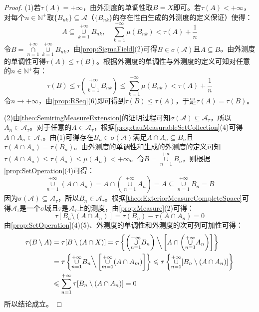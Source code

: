 \begin{proof}
	(1)若$\tau(A)=+\infty$，由外测度的单调性取$B=X$即可。若$\tau(A)<+\infty$，对每个$n\in\mathbb{N}^+$取$\{B_{nk}\}\subseteq\mathscr{A}$（$\{B_{nk}\}$的存在性由生成的外测度的定义保证）使得：
	\begin{equation*}
		A\subseteq\underset{k=1}{\overset{+\infty}{\cup}}B_{nk},\quad\sum_{k=1}^{+\infty}\mu(B_{nk})<\tau(A)+\frac{1}{n}
	\end{equation*}
	令$B=\underset{n=1}{\overset{+\infty}{\cap}}\underset{k=1}{\overset{+\infty}{\cup}}B_{nk}$，由\cref{prop:SigmaField}(2)可得$B\in\sigma(\mathscr{A})$且$A\subseteq B$。由外测度的单调性可得$\tau(A)\leqslant\tau(B)$。根据外测度的单调性与外测度的定义可知对任意的$n\in\mathbb{N}^+$有：
	\begin{equation*}
		\tau(B)\leqslant\tau\left(\underset{k=1}{\overset{+\infty}{\cup}}B_{nk}\right)\leqslant\sum_{k=1}^{+\infty}\mu(B_{nk})<\tau(A)+\frac{1}{n}
	\end{equation*}
	令$n\to+\infty$，由\cref{prop:RSeq}(6)即可得到$\tau(B)\leqslant\tau(A)$，于是$\tau(A)=\tau(B)$。\par
	(2)由\cref{theo:SemiringMeasureExtension}的证明过程可知$\sigma(\mathscr{A})\subseteq\mathscr{A}_\tau$，所以$A_n\in\mathscr{A}_\tau$。对于任意的$A\in\mathscr{A}_\tau$，根据\cref{prop:tauMeasurableSetCollection}(4)可得$A\cap A_n\in\mathscr{A}_\tau$。由(1)可得存在$B_n\in\sigma(\mathscr{A})$满足$A\cap A_n\subseteq B_n$且$\tau(A\cap A_n)=\tau(B_n)$。由外测度的单调性和生成的外测度的定义可知$\tau(A\cap A_n)\leqslant\tau(A_n)\leqslant\mu(A_n)<+\infty$。令$B=\underset{n=1}{\overset{+\infty}{\cup}}B_n$，则根据\cref{prop:SetOperation}(4)可得：
	\begin{equation*}
		\underset{n=1}{\overset{+\infty}{\cup}}(A\cap A_n)=A\cap\left(\underset{n=1}{\overset{+\infty}{\cup}}A_n\right)=A\subseteq\underset{n=1}{\overset{+\infty}{\cup}}B_n=B
	\end{equation*}
	因为$\sigma(\mathscr{A})\subseteq\mathscr{A}_\tau$，所以$B_n\in\mathscr{A}_\tau$。根据\cref{theo:ExteriorMeasureCompleteSpace}可得$\mathscr{A}_\tau$是一个$\sigma$域且$\tau$是$\mathscr{A}_\tau$上的测度，由\cref{prop:Measure}(2)可得：
	\begin{equation*}
		\tau[B_n\setminus (A\cap A_n)]=\tau(B_n)-\tau(A\cap A_n)=0
	\end{equation*}
	由\cref{prop:SetOperation}(4)(5)、外测度的单调性和外测度的次可列可加性可得：
	\begin{align*}
		\tau(B\setminus A)&=\tau[B\setminus(A\cap X)]=\tau\left\{\left(\underset{n=1}{\overset{+\infty}{\cup}}B_n\right)\Big\backslash\left[A\cap\left(\underset{n=1}{\overset{+\infty}{\cup}}A_n\right)\right]\right\} \\
		&=\tau\left\{\underset{n=1}{\overset{+\infty}{\cup}}B_n\Big\backslash\left[\underset{m=1}{\overset{+\infty}{\cup}}(A\cap A_m)\right]\right\}\leqslant\tau\left\{\underset{n=1}{\overset{+\infty}{\cup}}[B_n\setminus(A\cap A_n)]\right\} \\
		&\leqslant\sum_{n=1}^{+\infty}\tau[B_n\setminus(A\cap A_n)]=0
	\end{align*}
	所以结论成立。
\end{proof}

